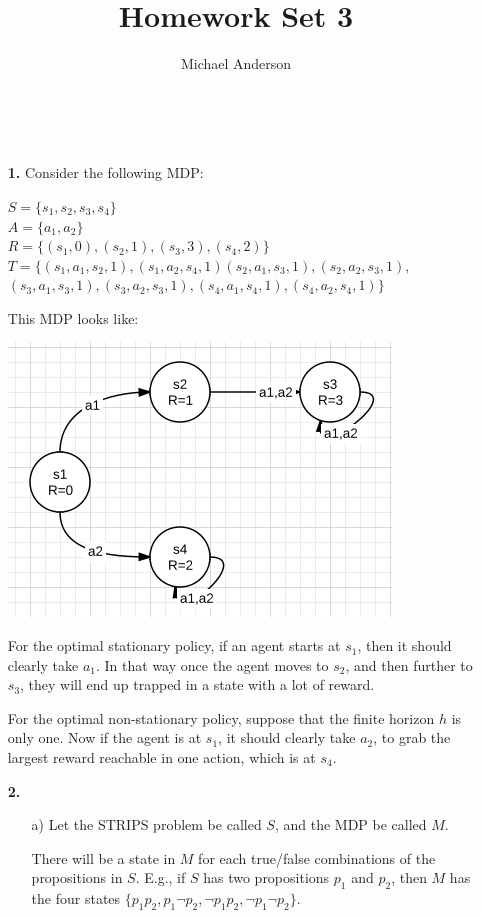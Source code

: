 \documentclass{article}
\author{Michael Anderson}
\title{Homework Set 3}
\begin{document}
\maketitle
{}
\\
\flushleft
\newpage

\begin{enumerate}
\item[\textbf{1.}]
Consider the following MDP:

$S = \{s_1, s_2, s_3, s_4\}$\\
$A = \{a_1, a_2\}$\\
$R = \{(s_1, 0), (s_2, 1), (s_3, 3), (s_4, 2)\}$\\
$T = \{(s_1,a_1,s_2,1), (s_1,a_2,s_4,1) (s_2,a_1,s_3,1), (s_2,a_2,s_3,1),$\\
$(s_3,a_1,s_3,1), (s_3,a_2,s_3,1), (s_4,a_1,s_4,1), (s_4,a_2,s_4,1)\}$

This MDP looks like:

\includegraphics{mdp1.png}

For the optimal stationary policy, if an agent starts at $s_1$, then it should
clearly take $a_1$. In that way once the agent moves to $s_2$, and then further to $s_3$, they will end up trapped in a state with a lot of reward.

For the optimal non-stationary policy, suppose that the finite horizon $h$ is
only one. Now if the agent is at $s_1$, it should clearly take $a_2$, to grab
the largest reward reachable in one action, which is at $s_4$.

\item[\textbf{2.}]
\begin{enumerate}
\item[a)]
Let the STRIPS problem be called $S$, and the MDP be called $M$.

There will be a state in $M$ for each true/false combinations of the
propositions in $S$. E.g., if $S$ has two propositions $p_1$ and $p_2$, then
$M$ has the four
states $\{p_1p_2, p_1 \neg p_2, \neg p_1p_2, \neg p_1 \neg p_2\}$.


\end{enumerate}
\end{enumerate}
\end{document}
